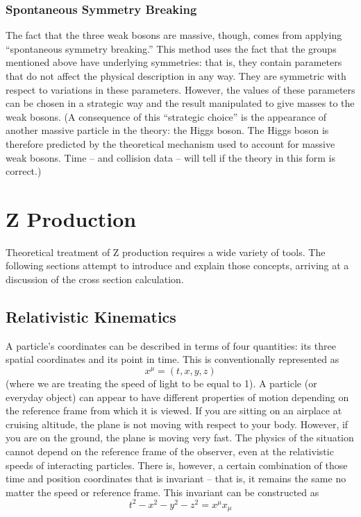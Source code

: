 \subsubsection{Spontaneous Symmetry Breaking}
\label{theory:SpontSymmBreak}
The fact that the three weak bosons are massive, though, 
comes from applying ``spontaneous symmetry breaking.''  
This method uses the fact that the groups mentioned 
above have underlying symmetries: 
that is, they contain parameters that do not affect the 
physical description in any way.  
They are symmetric with respect to variations in these parameters.  
However, the values of these parameters can be chosen 
in a strategic way and the result manipulated %
to give masses to the weak bosons.  
(A consequence of this ``strategic choice'' is the appearance 
of another massive particle in the theory: 
the Higgs boson.  
The Higgs boson is therefore predicted by the theoretical 
mechanism used to account for massive weak bosons.  
Time -- and collision data -- will tell if the theory 
in this form is correct.)  


\section{Z Production}
\label{theory:Zprod}

Theoretical treatment of Z production 
requires a wide variety of tools.  
The following sections attempt to introduce 
and explain those concepts, 
arriving at a discussion of the 
cross section calculation.  

\subsection{Relativistic Kinematics}
\label{theory:RelKin}
A particle's coordinates can be described in terms of 
four quantities: its three spatial coordinates 
and its point in time.  This is conventionally 
represented as 
\[
x^{\mu} = (t, x, y, z)
\]
(where we are treating the speed of light to be 
equal to 1).  
A particle (or everyday object) can appear to 
have different properties of motion 
depending on the reference 
frame from which it is viewed.  
If you are sitting on an airplace at cruising altitude, 
the plane is not moving with respect to your body.  
However, if you are on the ground, the plane is 
moving very fast. %
The physics of the situation cannot depend on 
the reference frame of the observer, 
even at the relativistic speeds of interacting particles.  
There is, however, a certain combination 
of those time and position coordinates that is 
invariant -- that is, it remains the same no 
matter the speed or reference frame.  
This invariant can be constructed as 
\[
t^2 - x^2 - y^2 - z^2 = x^{\mu} x_{\mu}
\]

